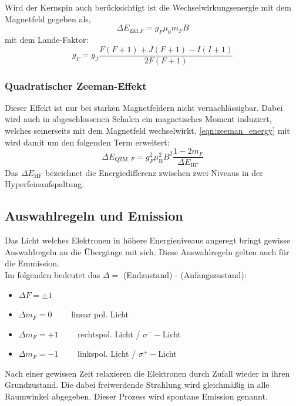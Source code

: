             Wird der Kernspin auch berücksichtigt ist die Wechselwirkungsenergie mit dem Magnetfeld gegeben als,
            \begin{equation*}
                \Delta E_{\text{ZM,}F} = g_F \mu_0 m_F B
            \end{equation*}
            mit dem Lande-Faktor:
            \begin{equation}
                g_F = g_J \frac{F(F+1) + J(F+1) - I(I+1)}{2F(F+1)}
                \label{eqn:g_F}
            \end{equation}

        \subsubsection*{Quadratischer Zeeman-Effekt}
            Dieser Effekt ist nur bei starken Magnetfeldern nicht vernachlässigbar. Dabei wird auch in abgeschlossenen Schalen ein magnetisches Moment induziert, welches seinerseits mit dem Magnetfeld wechselwirkt.
            \eqref{eqn:zeeman_energy} mit wird damit um den folgenden Term erweitert:
            \begin{equation}
                \Delta E_{\text{QZM},F} = g_F^2 \mu_{\text{B}}^2 B^2 \frac{1-2m_F}{\Delta E_{\text{HF}}}
                \label{eqn:quad_zeeman}
            \end{equation}
            Das $\Delta E_{\text{HF}}$ bezeichnet die Energiedifferenz zwischen zwei Niveaus in der Hyperfeinaufspaltung.

    \subsection{Auswahlregeln und Emission}
        Das Licht welches Elektronen in höhere Energieniveaus angeregt bringt gewisse Auswahlregeln an die Übergänge mit sich. Diese Auswahlregeln gelten auch für die Emmission.\\
        Im folgenden bedeutet das $\Delta = $ (Endzustand) - (Anfangszustand):
        \begin{itemize}
            \item $\Delta F = \pm 1$
            \item $\Delta m_F = 0 \qquad$ linear pol. Licht
            \item $\Delta m_F = +1 \qquad$ rechtspol. Licht / $\sigma^- -$Licht
            \item $\Delta m_F = -1 \qquad$ linkspol. Licht / $\sigma^+ -$Licht
        \end{itemize}
        Nach einer gewissen Zeit relaxieren die Elektronen durch Zufall wieder in ihren Grundzustand. Die dabei freiwerdende Strahlung wird gleichmäßig in alle Raumwinkel abgegeben. Dieser Prozess wird spontane Emission genannt.

